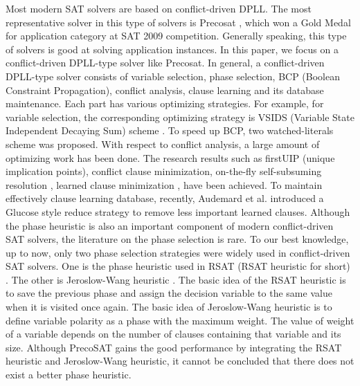 \documentclass{llncs}
\begin{document}
 Most modern SAT solvers are based on conflict-driven DPLL. The most
representative solver in this type of solvers is Precosat
\cite{PrecosatA:3,PrecosatB:4,Precosat10:5}, which won a Gold Medal
for application category at SAT 2009 competition. Generally
speaking, this type of solvers is good at solving application
instances. In this paper, we focus on a conflict-driven DPLL-type
solver like Precosat. In general, a conflict-driven DPLL-type solver
consists of variable selection, phase selection, BCP (Boolean
Constraint Propagation), conflict analysis, clause learning and its
database maintenance. Each part has various optimizing strategies.
For example, for variable selection, the corresponding optimizing
strategy is VSIDS (Variable State Independent Decaying Sum) scheme
\cite{CDCL:16}. To speed up BCP, two watched-literals scheme was
proposed. With respect to conflict analysis, a large amount of
optimizing work has been done. The research results such as firstUIP
(unique implication points), conflict clause minimization,
on-the-fly self-subsuming resolution \cite{Onfly:17}, learned clause
minimization \cite{Min:18}, have been achieved. To maintain
effectively clause learning database, recently, Audemard et al.
\cite{glue:19} introduced a Glucose style reduce strategy to remove
less important learned clauses. Although the phase heuristic is also
an important component of modern conflict-driven SAT solvers, the
literature on the phase selection is rare. To our best knowledge, up
to now, only two phase selection strategies were widely used in
conflict-driven SAT solvers. One is the phase heuristic used in RSAT
(RSAT heuristic for short) \cite{RsatHeuris:1}. The other is
Jeroslow-Wang heuristic \cite{JWheuris:2}. The basic idea of the
RSAT heuristic is to save the previous phase and assign the decision
variable to the same value when it is visited once again. The basic
idea of Jeroslow-Wang heuristic is to define variable polarity as a
phase with the maximum weight. The value of weight of a variable
depends on the number of clauses containing that variable and its
size. Although PrecoSAT \cite{Precosat10:5} gains the good
performance by integrating the RSAT heuristic and Jeroslow-Wang
heuristic, it cannot be concluded that there does not exist a better
phase heuristic.
\end{document}
